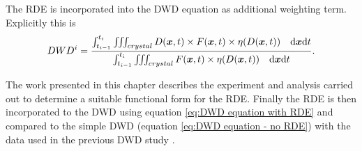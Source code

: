 The RDE is incorporated into the DWD equation as additional weighting term.
Explicitly this is
\begin{equation}
    DWD^i = \frac{\int_{t_{i-1}}^{t_{i}} \iiint_{crystal} D(\boldsymbol{x},t) \times F(\boldsymbol{x},t) \times \eta(D(\boldsymbol{x},t)) \quad \mathrm{d}\boldsymbol{x}\mathrm{d} t}{\int_{t_{i-1}}^{t_{i}} \iiint_{crystal}F(\boldsymbol{x},t) \times \eta(D(\boldsymbol{x},t)) \quad \mathrm{d}\boldsymbol{x}\mathrm{d} t}.
    \label{eq:DWD equation with RDE}
\end{equation}

The work presented in this chapter describes the experiment and analysis carried out to determine a suitable functional form for the RDE.
Finally the RDE is then incorporated to the DWD using equation \ref{eq:DWD equation with RDE} and compared to the simple DWD (equation \ref{eq:DWD equation - no RDE}) with the data used in the previous DWD study \cite{zeldin2013dwd}.
